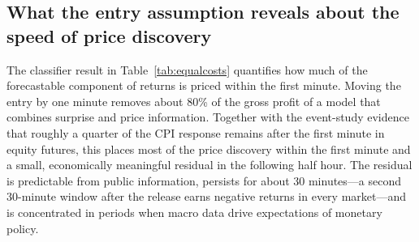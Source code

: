 \subsection{What the entry assumption reveals about the speed of price discovery}

The classifier result in Table~\ref{tab:equalcosts} quantifies how much of the forecastable
component of returns is priced within the first minute. Moving the entry by one minute removes
about 80\% of the gross profit of a model that combines surprise and price information. Together
with the event-study evidence that roughly a quarter of the CPI response remains after the first
minute in equity futures, this places most of the price discovery within the first minute and a
small, economically meaningful residual in the following half hour. The residual is predictable
from public information, persists for about 30 minutes---a second 30-minute window after the release
earns negative returns in every market---and is concentrated in periods when macro data drive
expectations of monetary policy.
